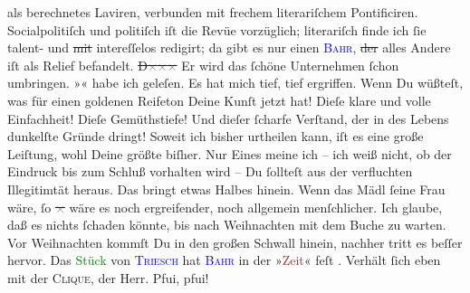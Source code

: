 \documentclass[twoside=false,titlepage=false,open=any, parskip=never, fontsize=12pt, headings=small, chapterprefix=false, appendixprefix=false]{scrbook}
\newcommand{\strikeout}[1]{\sout{#1}}
\newcommand{\pbposition}{\depth}
\newcommand{\pb}{\nobreak\hspace{0pt}\raisebox{-0.1em}{\raisebox{\pbposition}{\textnormal{|}}}\nobreak\hspace{0pt}}
\begin{document}
               als berechnetes Laviren, verbunden mit frechem literariſchem Pontificiren.
               Socialpolitiſch und politiſch iſt die Revüe vorzüglich; literariſch finde ich ſie
               talent- und \strikeout{mit} intereſſelos redigirt; da gibt es nur
               einen \textsc{\textcolor{blue}{Bahr}{}\ledrightnote{\textcolor{blue}{Hermann Bahr}}}, \strikeout{der} alles Andere iſt als Relief befandelt. \strikeout{D\textcolor{gray}{×}\-\textcolor{gray}{×}\-\textcolor{gray}{×}}{ }{\pb}Er
               wird das ſchöne Unternehmen ſchon umbringen.\pend
           \pstart
           »\label{K_L02616-111v}\label{K_L02616-111h}« habe ich geleſen. Es hat mich tief, tief ergriffen. Wenn Du
               wüßteſt, was für einen goldenen Reifeton Deine Kunſt jetzt hat! Dieſe klare und volle
               Einfachheit! Dieſe Gemüthstiefe! Und dieſer ſcharfe Verſtand, der in des Lebens
               dunkelſte Gründe dringt! Soweit ich bisher urtheilen kann, iſt es eine große
               Leiſtung, wohl Deine größte biſher. Nur Eines meine ich – ich weiß nicht, ob der
               Eindruck bis zum Schluß vorhalten wird – Du ſollteſt aus der verfluchten Illegitimtät
               heraus. Das bringt etwas {\pb}Halbes hinein. Wenn das
               Mädl ſeine Frau wäre, ſo \strikeout{\textcolor{gray}{×}} wäre es noch ergreifender, noch allgemein
               menſchlicher. Ich glaube, daß es nichts ſchaden könnte, bis nach
                  Weihnachten mit dem Buche zu warten. Vor Weihnachten
               kommſt Du in den großen Schwall hinein, nachher tritt es beſſer hervor.\pend
           \pstart
           Das \textcolor{green}{Stück}{} von \textsc{\textcolor{blue}{Triesch}{}\ledrightnote{\textcolor{blue}{Friedrich Gustav Triesch}}} hat \textsc{\textcolor{blue}{Bahr}{}\ledrightnote{\textcolor{blue}{Hermann Bahr}}} in der »\textcolor{brown}{Zeit}{}\ledrightnote{\textcolor{brown}{Die Zeit. Wiener Wochenschrift}}« feſt \label{K_mets_Goldmann_94-partII-98v}\label{K_mets_Goldmann_94-partII-89h}. Verhält ſich eben mit der \textsc{Clique}, der Herr. Pfui, pfui!\pend
\end{document}
